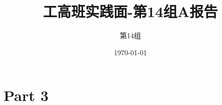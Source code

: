\documentclass{ctexart}
\title{工高班实践面-第14组A报告}
\author{第14组}
\date{\today}
\begin{document}
\section*{Part 3}

\end{document}
